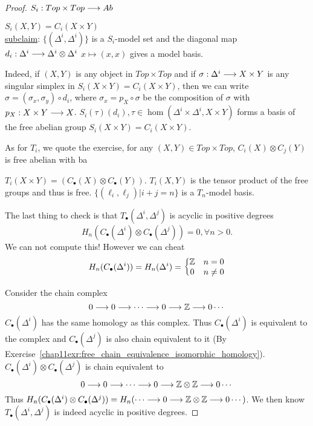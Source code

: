 \documentclass[11pt]{book} %
\begin{document}
\begin{proposition}
\begin{proof}
$S_i: Top\times Top\longrightarrow Ab$

$S_i(X, Y)=C_i (X\times Y)$\\
\underline{subclaim}: $\{(\Delta^i,\Delta^i)\}$ is a $S_i$-model set and the diagonal map $d_i:\Delta^i\longrightarrow\Delta^i\otimes \Delta^i$  $x\mapsto (x,x)$ gives a model basis.

Indeed, if $(X,Y)$ is any object in $Top\times Top$ and if $
\sigma: \Delta^i\longrightarrow X\times Y
$ is any singular simplex in $S_i(X\times Y)=C_i(X\times Y)$, then we can write 
$\sigma=(\sigma_x,\sigma_y)\circ d_i$,  where $\sigma_x=p_X\circ \sigma$ be the composition of $\sigma$ with $p_X:X\times Y\longrightarrow X$.
$S_i(\tau)(d_i), \tau\in \hom(\Delta^i\times \Delta^i,X\times Y)$ forms a basis of the free abelian group $S_i(X\times Y)=C_i(X\times Y)$.

As for $T_i$, we quote the exercise, for any $(X,Y)\in Top\times Top$, $C_i(X)\otimes C_j(Y)$ is free abelian with ba

 $T_i(X\times Y)=(C_\bullet(X)\otimes C_\bullet(Y))$. $T_i(X, Y)$ is the tensor product of the free groups and thus is free.
$\{(\ell_i,\ell_j)|i+j=n\}$ is a $T_n$-model basis.

The last thing to check is that $T_\bullet(\Delta^i, \Delta^j)$ is acyclic in positive degrees
$$
H_n(C_\bullet(\Delta^i)\otimes C_\bullet(\Delta^j))=0,\forall n>0.
$$
We can not compute this! However we can cheat
$$
H_n(C_\bullet(\Delta^i))=H_n(\Delta^i)=\left\{\begin{matrix}
 \mathbb Z & n=0\\
 0 & n\neq 0
\end{matrix}\right.
$$

Consider the chain complex
$$
0\longrightarrow 0\longrightarrow \cdots\longrightarrow 0\longrightarrow \mathbb Z\longrightarrow 0\cdots
$$
$C_\bullet(\Delta^i)$ has the same homology as this complex. Thus $C_\bullet(\Delta^i)$ is equivalent to the complex and $C_\bullet(\Delta^j)$ is also chain equivalent to it (By Exercise~\ref{chap11exr:free_chain_equivalence_isomorphic_homology}). $C_\bullet(\Delta^i)\otimes C_\bullet(\Delta^j)$ is chain equivalent to 
$$
0\longrightarrow 0\longrightarrow \cdots\longrightarrow 0\longrightarrow \mathbb Z\otimes \mathbb Z\longrightarrow 0\cdots
$$
Thus $H_n(C_\bullet(\Delta^i)\otimes C_\bullet(\Delta^j))=H_n(\cdots\longrightarrow0\longrightarrow \mathbb Z\otimes \mathbb Z\longrightarrow 0\cdots)$. We then know $T_\bullet(\Delta^i,\Delta^j)$ is indeed acyclic in positive degrees. 


\end{proof}
\end{proposition}
\end{document}
